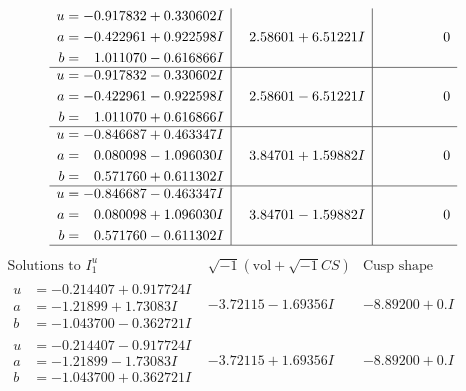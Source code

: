 \documentclass[1p]{elsarticle_modified}
\theoremstyle{definition}
\newcommand{\I}{\sqrt{-1}}
\begin{document}
$$\begin{array}{c|c|c}
\begin{aligned}
u &= -0.917832 + 0.330602 I \\
a &= -0.422961 + 0.922598 I \\
b &= \phantom{-}1.011070 - 0.616866 I\end{aligned}
 & \phantom{-}2.58601 + 6.51221 I & \phantom{-0.000000 } 0 \\ \hline\begin{aligned}
u &= -0.917832 - 0.330602 I \\
a &= -0.422961 - 0.922598 I \\
b &= \phantom{-}1.011070 + 0.616866 I\end{aligned}
 & \phantom{-}2.58601 - 6.51221 I & \phantom{-0.000000 } 0 \\ \hline\begin{aligned}
u &= -0.846687 + 0.463347 I \\
a &= \phantom{-}0.080098 - 1.096030 I \\
b &= \phantom{-}0.571760 + 0.611302 I\end{aligned}
 & \phantom{-}3.84701 + 1.59882 I & \phantom{-0.000000 } 0 \\ \hline\begin{aligned}
u &= -0.846687 - 0.463347 I \\
a &= \phantom{-}0.080098 + 1.096030 I \\
b &= \phantom{-}0.571760 - 0.611302 I\end{aligned}
 & \phantom{-}3.84701 - 1.59882 I & \phantom{-0.000000 } 0\\
 \hline 
 \end{array}$$\newpage$$\begin{array}{c|c|c}  
\text{Solutions to }I^u_{1}& \I (\text{vol} + \sqrt{-1}CS) & \text{Cusp shape}\\
 \hline 
\begin{aligned}
u &= -0.214407 + 0.917724 I \\
a &= -1.21899 + 1.73083 I \\
b &= -1.043700 - 0.362721 I\end{aligned}
 & -3.72115 - 1.69356 I & -8.89200 + 0. I\phantom{ +0.000000I} \\ \hline\begin{aligned}
u &= -0.214407 - 0.917724 I \\
a &= -1.21899 - 1.73083 I \\
b &= -1.043700 + 0.362721 I\end{aligned}
 & -3.72115 + 1.69356 I & -8.89200 + 0. I\phantom{ +0.000000I} \\ \hline\begin{aligned}

\end{aligned}
\end{array}$$
\end{document}
